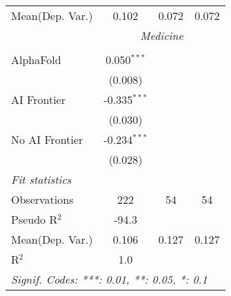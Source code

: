 \begin{tabular}{lccc}
Mean(Dep. Var.) & 0.102 & 0.072 & 0.072 \\
 & \multicolumn{3}{c}{\textit{Medicine}} \\ \\
   AlphaFold      & 0.050$^{***}$  &     &   \\   
                  & (0.008)        &     &   \\   
   AI Frontier    & -0.335$^{***}$ &     &   \\   
                  & (0.030)        &     &   \\   
   No AI Frontier & -0.234$^{***}$ &     &   \\   
                  & (0.028)        &     &   \\   
   \midrule
   \emph{Fit statistics}\\
   Observations   & 222            & 54  & 54\\  
   Pseudo R$^2$   & -94.3          &     & \\  
Mean(Dep. Var.) & 0.106 & 0.127 & 0.127 \\
   R$^2$          & 1.0            &     & \\  
   \midrule \midrule
   \multicolumn{4}{l}{\emph{Signif. Codes: ***: 0.01, **: 0.05, *: 0.1}}\\
\end{tabular}
\par\endgroup
